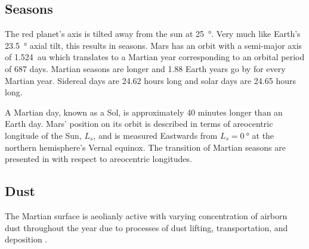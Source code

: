 %

\subsection{Seasons}
\label{sec:MartianEnvironment:Seasons}
The red planet's axis is tilted away from the sun at \SI{25}{\degree}. Very much like Earth's \SI{23.5}{\degree} axial tilt, this results in seasons. Mars has an orbit with a semi-major axis of \SI{1.524}{\astronomicalunit} which translates to a Martian year corresponding to an orbital period of 687 days. Martian seasons are longer and 1.88 Earth years go by for every Martian year. Sidereal days are 24.62 hours long and solar days are 24.65 hours long.

\vspace{0.5cm}


\vspace{0.5cm}

A Martian day, known as a Sol, is approximately 40 minutes longer than an Earth day. Mars' position on its orbit is described in terms of areocentric longitude of the Sun, $L_{s}$, and is measured Eastwards from $L_{s} = \SI{0}{\degree}$ at the northern hemisphere's Vernal equinox. The transition of Martian seasons are presented in  with respect to areocentric longitudes.

\clearpage
\subsection{Dust}
\label{sec:MartianEnvironment:Dust}
The Martian surface is aeolianly active with varying concentration of airborn dust throughout the year due to processes of dust lifting, transportation, and deposition .

